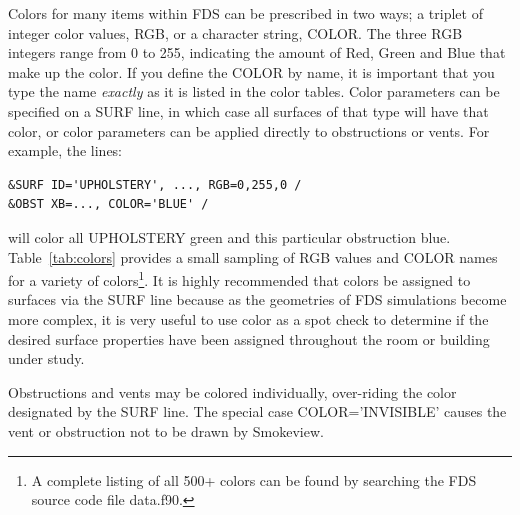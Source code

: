 \documentclass[11pt]{book}
\begin{document}
Colors for many items within FDS can be prescribed in two ways; a triplet of integer color values, {\ct RGB}, or a character string, {\ct COLOR}. The three {\ct RGB} integers range from 0 to 255, indicating the amount of Red, Green and Blue that make up the color. If you define the {\ct COLOR} by name, it is important that you type the name {\em exactly} as it is listed in the color tables. Color parameters can be specified on a {\ct SURF} line, in which case all surfaces of that type will have that color, or color parameters can be applied directly to obstructions or vents. For example, the lines:
\begin{lstlisting}
&SURF ID='UPHOLSTERY', ..., RGB=0,255,0 /
&OBST XB=..., COLOR='BLUE' /
\end{lstlisting}
will color all {\ct UPHOLSTERY} green and this particular obstruction blue. Table~\ref{tab:colors} provides a small sampling of {\ct RGB} values and {\ct COLOR} names for a variety of colors\footnote{A complete listing of all 500+ colors can be found by searching the FDS source code file {\ct data.f90}.}.
It is highly recommended that colors be assigned to surfaces via the {\ct SURF} line because as the geometries of FDS simulations become more complex, it is very useful to use color as a spot check to determine if the desired surface properties have been assigned throughout the room or building under study.

Obstructions and vents may be colored individually, over-riding the color designated by the {\ct SURF} line. The special case {\ct COLOR='INVISIBLE'} causes the vent or obstruction not to be drawn by Smokeview.
\end{document}
